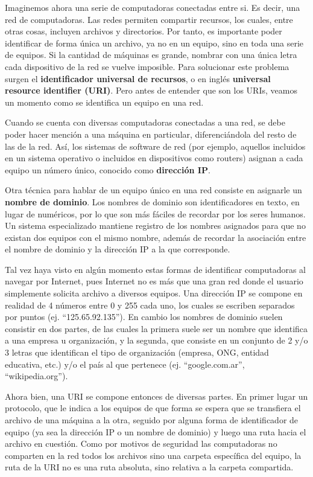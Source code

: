 Imaginemos ahora una serie de computadoras conectadas entre si. Es decir, una red
de computadoras. Las redes permiten compartir recursos, los cuales, entre otras
cosas, incluyen archivos y directorios. Por tanto, es importante poder identificar
de forma única un archivo, ya no en un equipo, sino en toda una serie de equipos.
Si la cantidad de máquinas es grande, nombrar con una única letra cada dispositivo
de la red se vuelve imposible. Para solucionar este problema surgen el \textbf{
identificador universal de recursos}, o en inglés \textbf{universal resource
identifier (URI)}. Pero antes de entender que son los URIs, veamos un momento
como se identifica un equipo en una red.

Cuando se cuenta con diversas computadoras conectadas a una red, se debe poder
hacer mención a una máquina en particular, diferenciándola del resto de las de
la red. Así, los sistemas de software de red (por ejemplo, aquellos incluidos
en un sistema operativo o incluidos en dispositivos como routers) asignan a cada
equipo un número único, conocido como \textbf{dirección IP}. 

Otra técnica para hablar de un equipo único en una red consiste en asignarle un
\textbf{nombre de dominio}. Los nombres de dominio son identificadores en texto,
en lugar de numéricos, por lo que son más fáciles de recordar por los seres humanos.
Un sistema especializado mantiene registro de los nombres asignados para que no
existan dos equipos con el mismo nombre, además de recordar la asociación entre
el nombre de dominio y la dirección IP a la que corresponde.

Tal vez haya visto en algún momento estas formas de identificar computadoras
al navegar por Internet, pues Internet no es más que una gran red donde el
usuario simplemente solicita archivo a diversos equipos. Una dirección IP
se compone en realidad de 4 números entre 0 y 255 cada uno, los cuales se
escriben separados por puntos (ej. ``125.65.92.135''). En cambio los nombres
de dominio suelen consistir en dos partes, de las cuales la primera suele ser
un nombre que identifica a una empresa u organización, y la segunda, que consiste
en un conjunto de 2 y/o 3 letras que identifican el tipo de organización (empresa,
ONG, entidad educativa, etc.) y/o el país al que pertenece (ej. ``google.com.ar'',
``wikipedia.org'').

Ahora bien, una URI se compone entonces de diversas partes. En primer lugar un
protocolo, que le indica a los equipos de que forma se espera que se transfiera
el archivo de una máquina a la otra, seguido por alguna forma de identificador
de equipo (ya sea la dirección IP o un nombre de dominio) y luego una ruta hacia
el archivo en cuestión. Como por motivos de seguridad las computadoras no
comparten en la red todos los archivos sino una carpeta específica del equipo,
la ruta de la URI no es una ruta absoluta, sino relativa a la carpeta compartida.
\autocite{rfc7320_2014}

